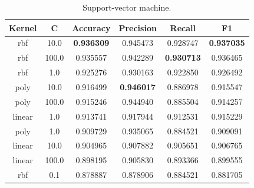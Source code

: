 \begin{appendices}
\begin{table}[ht]
\bigskip
\begin{subtable}{\textwidth}
\begin{adjustbox}{minipage=15cm, center}
\centering
\begin{tabular*}{\textwidth}{c @{\extracolsep{\fill}} ccccc}
\toprule
 Kernel &      C &  Accuracy &  Precision &    Recall &        F1 \\
\midrule
    rbf &   10.0 & \textbf{0.936309} &   0.945473 &  0.928747 &  \textbf{0.937035} \\
    rbf &  100.0 &  0.935557 &   0.942289 &  \textbf{0.930713} &  0.936465 \\
    rbf &    1.0 &  0.925276 &   0.930163 &  0.922850 &  0.926492 \\
   poly &   10.0 &  0.916499 &   \textbf{0.946017} &  0.886978 &  0.915547 \\
   poly &  100.0 &  0.915246 &   0.944940 &  0.885504 &  0.914257 \\
 linear &    1.0 &  0.913741 &   0.917944 &  0.912531 &  0.915229 \\
   poly &    1.0 &  0.909729 &   0.935065 &  0.884521 &  0.909091 \\
 linear &   10.0 &  0.904965 &   0.907882 &  0.905651 &  0.906765 \\
 linear &  100.0 &  0.898195 &   0.905830 &  0.893366 &  0.899555 \\
    rbf &    0.1 &  0.878887 &   0.878906 &  0.884521 &  0.881705 \\
\bottomrule
\end{tabular*}
\caption{Support-vector machine.}
\label{tab:Support-vector machine}
\end{adjustbox}
\end{subtable}



\end{table}
\end{appendices}
